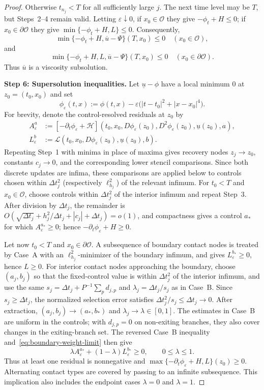 \documentclass[10pt,a4paper]{amsart}
\newcommand{\cO}{\mathcal{O}}
\newcommand{\dt}{\Delta t}
\begin{document}
\begin{proof}
		Otherwise $t_{n_j}<T$ for all sufficiently large $j$.  The next time level
		may be $T$, but Steps~2--4 remain valid.  Letting $\varepsilon\downarrow0$,
		if $x_0\in\cO$ they give
		$-\phi_t+H\le0$; if $x_0\in\partial\cO$ they give
		$\min\{-\phi_t+H,L\}\le0$.  Consequently,
		\[
		\min\{-\phi_t+H,\overline u-\Psi\}(T,x_0)\le0
		\quad(x_0\in\cO),
		\]
		and
		\[
		\min\{-\phi_t+H,L,\overline u-\Psi\}(T,x_0)\le0
		\quad(x_0\in\partial\cO).
		\]
		Thus $\overline u$ is a viscosity subsolution.
		
		\medskip
		\noindent\textbf{Step 6: Supersolution inequalities.}
		Let $\underline u-\phi$ have a local minimum $0$ at
		$z_0=(t_0,x_0)$ and set
		\[
		\phi_\varepsilon(t,x)
		:=\phi(t,x)-\varepsilon\bigl(|t-t_0|^2+|x-x_0|^4\bigr).
		\]
		For brevity, denote the control-resolved residuals at $z_0$ by
		\begin{align*}
			A_\varepsilon^a
			&:=[-\partial_t\phi_\varepsilon+\mathcal H]
			(t_0,x_0,D\phi_\varepsilon(z_0),D^2\phi_\varepsilon(z_0),
			\underline u(z_0),a),\\
			L_\varepsilon^b
			&:=\mathcal L(t_0,x_0,D\phi_\varepsilon(z_0),
			\underline u(z_0),b).
		\end{align*}
		Repeating Step~1 with minima in place of maxima gives recovery nodes
		$z_j\to z_0$, constants $c_j\to0$, and the corresponding lower stencil
		comparisons.  Since both discrete updates are infima, these comparisons are
		applied below to controls chosen within $\dt_j^2$ (respectively
		$\ell_{h_j}^2$) of the relevant infimum.
		For $t_0<T$ and $x_0\in\cO$, choose controls within $\dt_j^2$ of the
		interior infimum and repeat Step~3.  After division by $\dt_j$, the remainder
		is $O(\sqrt{\dt_j}+h_j^2/\dt_j+|c_j|+\dt_j)=o(1)$, and compactness gives a
		control $a_*$ for which $A_\varepsilon^{a_*}\ge0$; hence
		$-\partial_t\phi_\varepsilon+H\ge0$.
		
		Let now $t_0<T$ and $x_0\in\partial\cO$.  A subsequence of boundary
		contact nodes is treated by Case~A with an $\ell_{h_j}^2$-minimizer of the
		boundary infimum, and gives $L_\varepsilon^{b_*}\ge0$, hence $L\ge0$.
		For interior contact nodes approaching the boundary, choose $(a_j,b_j)$
		so that the fixed-control value is within $\dt_j^2$ of the interior
		infimum, and use the same
		$s_j=\dt_j+P^{-1}\sum_p d_{j,p}$ and $\lambda_j=\dt_j/s_j$ as in Case~B.
		Since $s_j\ge\dt_j$, the normalized selection error satisfies
		$\dt_j^2/s_j\le\dt_j\to0$.  After extraction,
		$(a_j,b_j)\to(a_*,b_*)$ and $\lambda_j\to\lambda\in[0,1]$.
		The estimates in Case~B are uniform in the controls; with $d_{j,p}=0$ on
		non-exiting branches, they also cover changes in the exiting-branch set.
		The reversed Case~B inequality and~\eqref{eq:boundary-weight-limit} then give
		\[
		\lambda A_\varepsilon^{a_*}+(1-\lambda)L_\varepsilon^{b_*}\ge0,
		\qquad 0\le\lambda\le1.
		\]
		Thus at least one residual is nonnegative and
		$\max\{-\partial_t\phi_\varepsilon+H,L\}(z_0)\ge0$.  Alternating contact
		types are covered by passing to an infinite subsequence.  This implication
		also includes the endpoint cases $\lambda=0$ and $\lambda=1$.
		

\end{proof}
\end{document}
